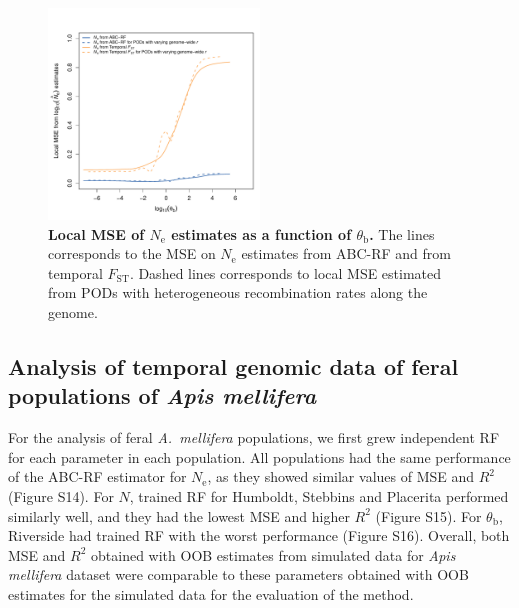 \documentclass[a4paper, 12pt]{article}
\begin{document}
\begin{figure}[ht]
  \centering
  \includegraphics[width=0.50\textwidth]{Figures/Figure3_abcrfNE_fstNE_local_mse_recomb.pdf}
  \small\caption{\textbf{Local MSE of $N_{\mathrm{e}}$ estimates as a function of $\theta_{\mathrm{b}}$.} The lines corresponds to the MSE on $N_{\mathrm{e}}$ estimates from ABC-RF and from temporal $F_{\mathrm{ST}}$. Dashed lines corresponds to local MSE estimated from PODs with heterogeneous recombination rates along the genome.}
  \label{fig:local_mse_nes}
\end{figure}

\subsection*{Analysis of temporal genomic data of feral populations of \textit{Apis mellifera}}

For the analysis of feral \textit{A.\ mellifera} populations, we first grew independent RF for each parameter in each population. All populations had the same performance of the ABC-RF estimator for $N_{\mathrm{e}}$, as they showed similar values of MSE and $R^2$ (Figure S14). For $N$, trained RF for Humboldt, Stebbins and Placerita performed similarly well, and they had the lowest MSE and higher $R^2$ (Figure S15). For $\theta_\mathrm{b}$, Riverside had trained RF with the worst performance (Figure S16). Overall, both MSE and $R^2$ obtained with OOB estimates from simulated data for \textit{Apis mellifera} dataset were comparable to these parameters obtained with OOB estimates for the simulated data for the evaluation of the method. 
\end{document}
